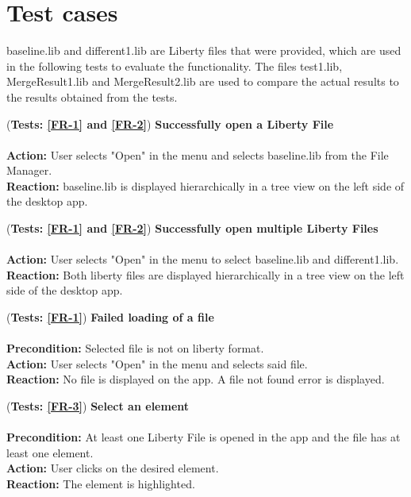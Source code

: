 \documentclass[10pt,a4paper]{report}
\newcommand{\precondition}[1]{
    \textbf{Precondition: } #1 \leavevmode \\
}
\newcommand{\action}[1]{
    \textbf{Action: } #1 \leavevmode \\
}
\newcommand{\reaction}[1]{
    \textbf{Reaction: } #1 \leavevmode \\
}
\newcommand{\GTCDescription}[2]{
    (\textbf{Tests: #1}) \textbf{#2} \leavevmode \\
}
\begin{document}
\section{Test cases}

  baseline.lib and different1.lib are Liberty files that were provided, which are used in the following tests to evaluate the functionality. The files test1.lib, MergeResult1.lib and MergeResult2.lib are used to compare the actual results to the results obtained from the tests.
  
\begin{GTC}
    \item \GTCDescription{\ref{FR-1} and \ref{FR-2}}{Successfully open a Liberty File} \leavevmode \\ \action{User selects "Open" in the menu and selects baseline.lib from the File Manager.}\reaction{baseline.lib is displayed hierarchically in a tree view on the left side
    of the desktop app.
}
    \item \GTCDescription{\ref{FR-1} and \ref{FR-2}}{Successfully open multiple Liberty Files} \leavevmode \\ \action{User selects "Open" in the menu to select baseline.lib and different1.lib.}\reaction{Both liberty files are displayed hierarchically in a tree view on the left side of the desktop app.
}
    \item \GTCDescription{\ref{FR-1}}{Failed loading of a file} \leavevmode \\ \precondition{Selected file is not on liberty format.}\action{User selects "Open" in the menu and selects said file.}\reaction{No file is displayed on the app. A file not found error is displayed.
}
    \item \GTCDescription{\ref{FR-3}}{Select an element} \leavevmode \\ \precondition{At least one Liberty File is opened in the app and the file has at least one element.}\action{User clicks on the desired element.}\reaction{The element is highlighted.
}


\end{GTC}
\end{document}
